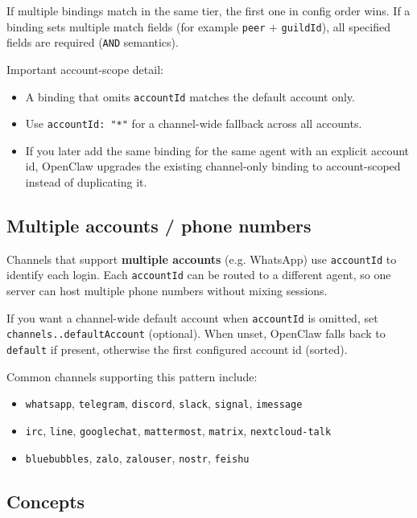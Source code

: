 If multiple bindings match in the same tier, the first one in config order wins.
If a binding sets multiple match fields (for example \texttt{peer} + \texttt{guildId}), all specified fields are required (\texttt{AND} semantics).

Important account-scope detail:

\begin{itemize}
  \item A binding that omits \texttt{accountId} matches the default account only.
  \item Use \texttt{accountId: "*"} for a channel-wide fallback across all accounts.
  \item If you later add the same binding for the same agent with an explicit account id, OpenClaw upgrades the existing channel-only binding to account-scoped instead of duplicating it.
\end{itemize}


\subsection{Multiple accounts / phone numbers}


Channels that support \textbf{multiple accounts} (e.g. WhatsApp) use \texttt{accountId} to identify
each login. Each \texttt{accountId} can be routed to a different agent, so one server can host
multiple phone numbers without mixing sessions.

If you want a channel-wide default account when \texttt{accountId} is omitted, set
\texttt{channels..defaultAccount} (optional). When unset, OpenClaw falls back
to \texttt{default} if present, otherwise the first configured account id (sorted).

Common channels supporting this pattern include:

\begin{itemize}
  \item \texttt{whatsapp}, \texttt{telegram}, \texttt{discord}, \texttt{slack}, \texttt{signal}, \texttt{imessage}
  \item \texttt{irc}, \texttt{line}, \texttt{googlechat}, \texttt{mattermost}, \texttt{matrix}, \texttt{nextcloud-talk}
  \item \texttt{bluebubbles}, \texttt{zalo}, \texttt{zalouser}, \texttt{nostr}, \texttt{feishu}
\end{itemize}


\subsection{Concepts}


